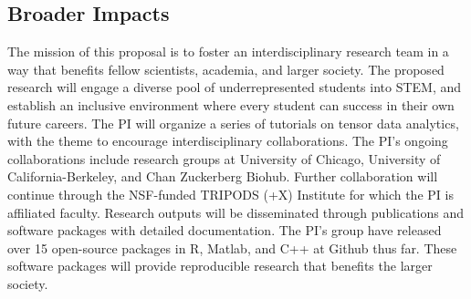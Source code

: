 \documentclass[11pt]{article}
\theoremstyle{exampstyle}
\theoremstyle{definition}
\begin{document}
  \vspace{-.3cm}
\subsection{Broader Impacts}
  \vspace{-.3cm}
The mission of this proposal is to foster an interdisciplinary research team in a way that benefits fellow scientists, academia, and larger society. The proposed research will engage a diverse pool of underrepresented students into STEM, and establish an inclusive environment where every student can success in their own future careers. The PI will organize a series of tutorials on tensor data analytics, with the theme to encourage interdisciplinary collaborations. The PI's ongoing collaborations include research groups at University of Chicago, University of California-Berkeley, and Chan Zuckerberg Biohub. Further collaboration will continue through the NSF-funded TRIPODS (+X) Institute for which the PI is affiliated faculty. Research outputs will be disseminated through publications and software packages with detailed documentation. The PI's group have released over 15 open-source packages in R, Matlab, and C++ at Github thus far. These software packages will provide reproducible research that benefits the larger society. 
\newpage
\setcounter{page}{1}
\end{document}
